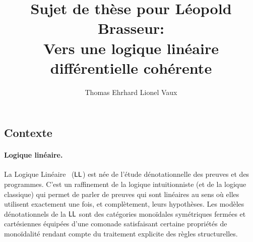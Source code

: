\documentclass[a4]{article}
\title{Sujet de thèse pour Léopold Brasseur:\\
  Vers une logique linéaire différentielle cohérente}
\author{Thomas Ehrhard \hspace{5em} Lionel Vaux}
\begin{document}
\maketitle

\subsection*{Contexte}

\paragraph*{Logique linéaire.}
La Logique Linéaire~\cite{Girard87} ($\hbox{\textsf{LL}}$) est née de l'étude
dé\-no\-ta\-tion\-nelle des preuves et des programmes.
%
C'est un raffinement de la logique intuitionniste (et de la logique
classique) qui permet de parler de preuves qui sont linéaires au sens
où elles utilisent exactement une fois, et complètement, leurs
hypothèses.
%
%
Les modèles dénotationnels de la $\hbox{\textsf{LL}}$ sont des catégories monoïdales
sy\-mé\-tri\-ques fermées et cartésiennes équipées d'une comonade
satisfaisant certaine propriétés de monoïdalité rendant compte du
traitement explicite des règles structurelles.
\end{document}
